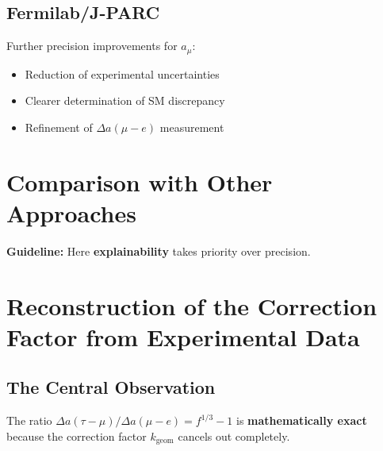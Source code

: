 	\subsection{Fermilab/J-PARC}
	
	Further precision improvements for $a_\mu$:
	\begin{itemize}
		\item Reduction of experimental uncertainties
		\item Clearer determination of SM discrepancy
		\item Refinement of $\Delta a(\mu - e)$ measurement
	\end{itemize}
	
	\section{Comparison with Other Approaches}
	
	\begin{table}[h]
		\centering
		\caption{Comparison of different approaches}
	\end{table}
	
	\textbf{Guideline:} Here \textbf{explainability} takes priority over precision.
	
	\section{Reconstruction of the Correction Factor from Experimental Data}
	
	\subsection{The Central Observation}
	
	The ratio $\Delta a(\tau-\mu) / \Delta a(\mu-e) = f^{1/3} - 1$ is \textbf{mathematically exact} because the correction factor $k_{\text{geom}}$ cancels out completely.
	
